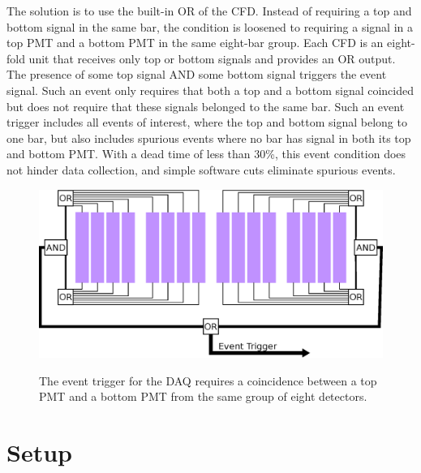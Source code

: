 The solution is to use the built-in OR of the CFD.  Instead of requiring a top and bottom signal in the same bar, the condition is loosened to requiring a signal in a top PMT and a bottom PMT in the same eight-bar group.  Each CFD is an eight-fold unit that receives only top or bottom signals and provides an OR output.  The presence of some top signal AND some bottom signal triggers the event signal.  Such an event only requires that both a top and a bottom signal coincided but does not require that these signals belonged to the same bar.  Such an event trigger includes all events of interest, where the top and bottom signal belong to one bar, but also includes spurious events where no bar has signal in both its top and bottom PMT.  With a dead time of less than 30\%, this event condition does not hinder data collection, and simple software cuts eliminate spurious events.

\begin{figure}[htp]
\centering
\includegraphics[width=1.0\textwidth]{figures/event_trigger.eps}
\label{fig:eventTrig}
\caption{The event trigger for the DAQ requires a coincidence between a top PMT and a bottom PMT from the same group of eight detectors.}
\end{figure}


\section{Setup}

